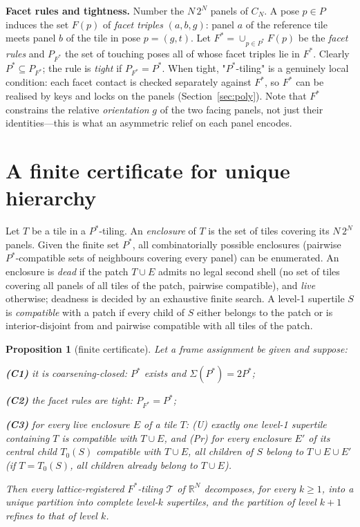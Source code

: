 \documentclass[11pt,a4paper]{article}
\theoremstyle{plain}
\newtheorem{proposition}[theorem]{Proposition}
\theoremstyle{definition}
\begin{document}
\textbf{Facet rules and tightness.} Number the $N\,2^N$ panels of $C_N$. A pose $p \in P$ induces the set $F(p)$ of \emph{facet triples} $(a, b, g)$: panel $a$ of the reference tile meets panel $b$ of the tile in pose $p = (g, t)$. Let $F^* = \cup_{p \in P^*} F(p)$ be the \emph{facet rules} and $P_{F^*}$ the set of touching poses all of whose facet triples lie in $F^*$. Clearly $P^* \subseteq P_{F^*}$; the rule is \emph{tight} if $P_{F^*} = P^*$. When tight, "$P^*$-tiling" is a genuinely local condition: each facet contact is checked separately against $F^*$, so $F^*$ can be realised by keys and locks on the panels (Section~\ref{sec:poly}). Note that $F^*$ constrains the relative \emph{orientation} $g$ of the two facing panels, not just their identities---this is what an asymmetric relief on each panel encodes.

\section{A finite certificate for unique hierarchy}\label{sec:cert}

Let $T$ be a tile in a $P^*$-tiling. An \emph{enclosure} of $T$ is the set of tiles covering its $N\,2^N$ panels. Given the finite set $P^*$, all combinatorially possible enclosures (pairwise $P^*$-compatible sets of neighbours covering every panel) can be enumerated. An enclosure is \emph{dead} if the patch $T \cup E$ admits no legal second shell (no set of tiles covering all panels of all tiles of the patch, pairwise compatible), and \emph{live} otherwise; deadness is decided by an exhaustive finite search. A level-1 supertile $S$ is \emph{compatible} with a patch if every child of $S$ either belongs to the patch or is interior-disjoint from and pairwise compatible with all tiles of the patch.

\begin{proposition}[finite certificate]\label{prop:cert}
Let a frame assignment be given and suppose:

\textbf{(C1)} it is coarsening-closed: $P^*$ exists and $\Sigma(P^*) = 2P^*$;

\textbf{(C2)} the facet rules are tight: $P_{F^*} = P^*$;

\textbf{(C3)} for every live enclosure $E$ of a tile $T$: (U) exactly one level-1 supertile containing $T$ is compatible with $T \cup E$, and (Pr) for every enclosure $E'$ of its central child $T_0(S)$ compatible with $T \cup E$, all children of $S$ belong to $T \cup E \cup E'$ (if $T = T_0(S)$, all children already belong to $T \cup E$).

Then every lattice-registered $F^*$-tiling $\mathcal{T}$ of $\mathbb{R}^N$ decomposes, for every $k \ge  1$, into a unique partition into complete level-$k$ supertiles, and the partition of level $k+1$ refines to that of level $k$.
\end{proposition}
\end{document}
